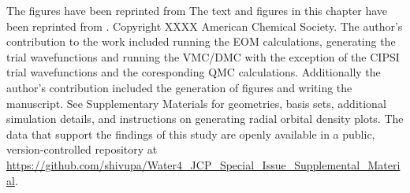 The figures have been reprinted from \cite{10.1063/5.0030942}
The text and figures in this chapter have been reprinted from \cite{10.1063/5.0030942}.
Copyright XXXX American Chemical Society. %
The author's contribution to the work included running the EOM calculations, generating the trial wavefunctions and running the VMC/DMC with the exception of the CIPSI trial wavefunctions and the coresponding QMC calculations. Additionally the author's contribution included the generation of figures and writing the manuscript.
See Supplementary Materials for geometries, basis sets, additional simulation details, and instructions on generating radial orbital density plots.
The data that support the findings of this study are openly available in a public, version-controlled repository at \url{https://github.com/shivupa/Water4_JCP_Special_Issue_Supplemental_Material}.
